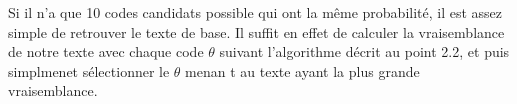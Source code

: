 \documentclass[11pt]{report}
\begin{document}
\subsubsection{}

Si il n'a que 10 codes candidats possible qui ont la même probabilité, il est assez simple de retrouver le texte de base. Il suffit en effet de calculer la vraisemblance de notre texte avec chaque code $\theta$ suivant l'algorithme décrit au point 2.2, et puis simplmenet sélectionner le $\theta$ menan	t au texte ayant la plus grande vraisemblance.
\subsubsection{}
\subsubsection{}
\subsubsection{}
\end{document}
